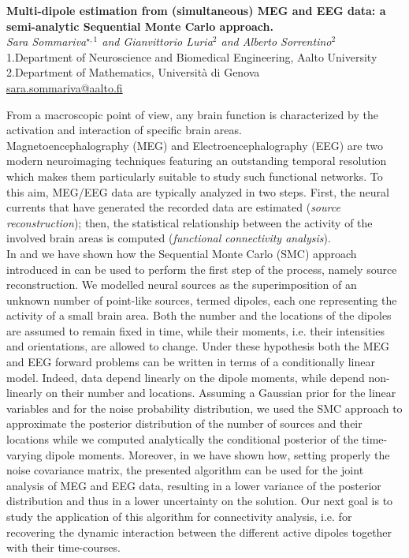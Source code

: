 \documentclass[12pt]{article}
\newcommand{\postertitle}[1]{{\Large\bf #1}\\[12pt]}
\newcommand{\authors}[1]{\emph{#1}\\}
\newcommand{\affiliations}[1]{{#1}\\}
\newcommand{\contacts}[1]{{#1}}
\begin{document}
\begin{center}
\vspace*{0.5cm}
%
\postertitle{Multi-dipole estimation from (simultaneous) MEG and EEG data: a semi-analytic
Sequential Monte Carlo approach.}
%
\authors{Sara Sommariva$^{\star, 1}$ and Gianvittorio Luria$^2$ and Alberto Sorrentino$^2$} %
% 
\affiliations{1.Department of Neuroscience and Biomedical Engineering, Aalto University \\
2.Department of Mathematics, Universit\`a di Genova}
%
\contacts{\url{sara.sommariva@aalto.fi}} %
%
\vspace*{0.3cm}
\end{center}

From a macroscopic point of view, any brain function is characterized by the activation and
interaction of specific brain areas.\\
Magnetoencephalography (MEG) and Electroencephalography (EEG) are two modern
neuroimaging techniques featuring an outstanding temporal resolution which makes them
particularly suitable to study such functional networks. To this aim, MEG/EEG data are
typically analyzed in two steps. First, the neural currents that have generated the recorded
data are estimated (\textit{source reconstruction}); then, the statistical relationship between 
the activity of the involved brain areas is computed (\textit{functional connectivity analysis}).\\

\noindent
In \cite{soso14} and \cite{soetal14} we have shown how the Sequential Monte Carlo (SMC) approach introduced in
\cite{DelMoetal06} can be used to perform the first step of the process, namely source reconstruction.
We modelled neural sources as the superimposition of an unknown number of point-like
sources, termed dipoles, each one representing the activity of a small brain area. Both the
number and the locations of the dipoles are assumed to remain fixed in time, while their
moments, i.e. their intensities and orientations, are allowed to change.
Under these hypothesis both the MEG and EEG forward problems can be written in terms of
a conditionally linear model. Indeed, data depend linearly on the dipole moments, while
depend non-linearly on their number and locations. Assuming a Gaussian prior for the linear
variables and for the noise probability distribution, we used the SMC approach to
approximate the posterior distribution of the number of sources and their locations while we
computed analytically the conditional posterior of the time-varying dipole moments.
Moreover, in \cite{roetal17} we have shown how, setting properly the noise covariance matrix, the
presented algorithm can be used for the joint analysis of MEG and EEG data, resulting in a
lower variance of the posterior distribution and thus in a lower uncertainty on the solution.
Our next goal is to study the application of this algorithm for connectivity analysis, i.e. for
recovering the dynamic interaction between the different active dipoles together with their
time-courses.
\end{document}
